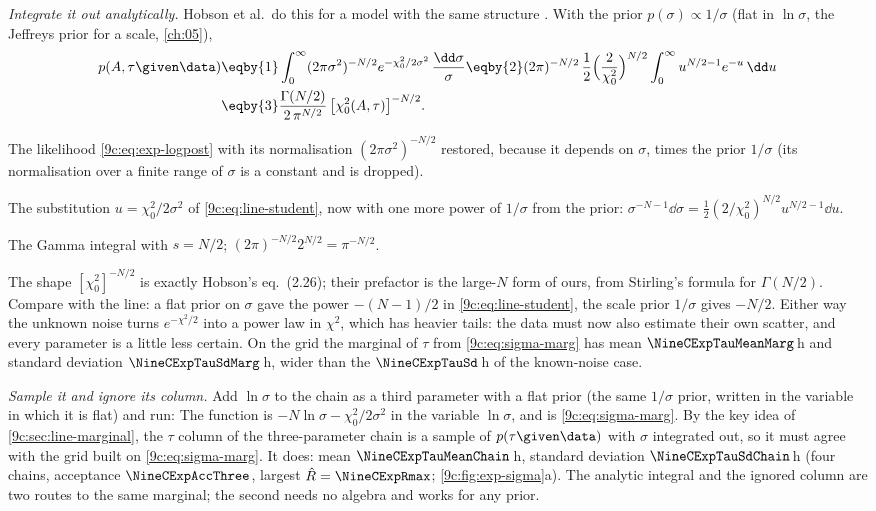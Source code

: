 \emph{Integrate it out analytically.} Hobson et al.\ do this for a model with the same structure
. With the prior $p(\sigma)\propto1/\sigma$ (flat in $\ln\sigma$,
the Jeffreys prior for a scale, \cref{ch:05}),
\begin{align}
  p(A,\tau\given\data)
  &\eqby{1}\int_0^\infty(2\pi\sigma^2)^{-N/2}e^{-\chi^2_0/2\sigma^2}\,\frac{\dd\sigma}{\sigma}
   \eqby{2}(2\pi)^{-N/2}\,\frac12\Bigl(\frac{2}{\chi^2_0}\Bigr)^{N/2}\int_0^\infty u^{N/2-1}e^{-u}\,\dd u
   \nonumber\\
  &\eqby{3}\frac{\Gamma(N/2)}{2\,\pi^{N/2}}\,\bigl[\chi^2_0(A,\tau)\bigr]^{-N/2}.
  \label{9c:eq:sigma-marg}
\end{align}
\begin{explain}
  \item The likelihood \eqref{9c:eq:exp-logpost} with its normalisation $(2\pi\sigma^2)^{-N/2}$ restored,
        because it depends on $\sigma$, times the prior $1/\sigma$ (its normalisation over a finite range
        of $\sigma$ is a constant and is dropped).
  \item The substitution $u=\chi_0^2/2\sigma^2$ of \eqref{9c:eq:line-student}, now with one more power
        of $1/\sigma$ from the prior: $\sigma^{-N-1}\dd\sigma=\tfrac12(2/\chi_0^2)^{N/2}u^{N/2-1}\dd u$.
  \item The Gamma integral with $s=N/2$; $(2\pi)^{-N/2}2^{N/2}=\pi^{-N/2}$.
\end{explain}
The shape $[\chi^2_0]^{-N/2}$ is exactly Hobson's eq.~(2.26); their prefactor is the large-$N$ form of
ours, from Stirling's formula for $\Gamma(N/2)$. Compare with the line: a flat prior on $\sigma$ gave the
power $-(N-1)/2$ in \eqref{9c:eq:line-student}, the scale prior $1/\sigma$ gives $-N/2$. Either way the
unknown noise turns $e^{-\chi^2/2}$ into a power law in $\chi^2$, which has heavier tails: the data
must now also estimate their own scatter, and every parameter is a little less certain. On the grid
the marginal of $\tau$ from \eqref{9c:eq:sigma-marg} has mean $\NineCExpTauMeanMarg$\,h and standard
deviation $\NineCExpTauSdMarg$\,h, wider than the $\NineCExpTauSd$\,h of the known-noise case.

\emph{Sample it and ignore its column.} Add $\ln\sigma$ to the chain as a third parameter with a flat
prior (the same $1/\sigma$ prior, written in the variable in which it is flat) and run:
The function  is $-N\ln\sigma-\chi^2_0/2\sigma^2$ in the variable $\ln\sigma$, and
 is \eqref{9c:eq:sigma-marg}. By the key idea of \cref{9c:sec:line-marginal}, the $\tau$
column of the three-parameter chain is a sample of $p(\tau\given\data)$ with $\sigma$ integrated out, so
it must agree with the grid built on \eqref{9c:eq:sigma-marg}. It does: mean $\NineCExpTauMeanChain$\,h,
standard deviation $\NineCExpTauSdChain$\,h (four chains, acceptance $\NineCExpAccThree$, largest
$\hat R=\NineCExpRmax$; \cref{9c:fig:exp-sigma}a). The analytic integral and the ignored column are two
routes to the same marginal; the second needs no algebra and works for any prior.

